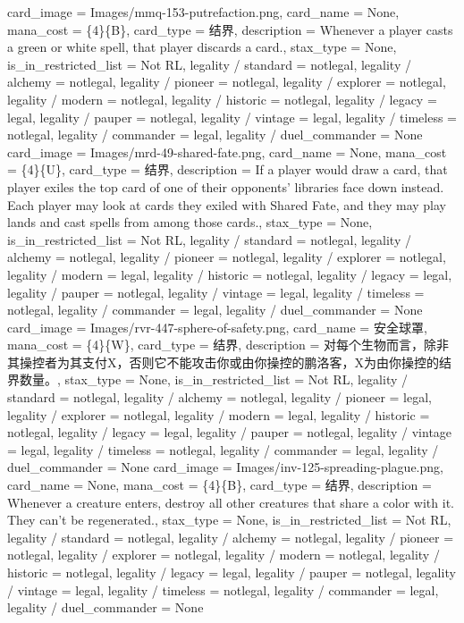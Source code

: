 \documentclass[lang = cn, color = black, 10pt]{AllThatStax}
\begin{document}
\card
{
	card_image = Images/mmq-153-putrefaction.png,
	card_name = None,
	mana_cost = \{4\}\{B\},
	card_type = 结界,
	description = Whenever a player casts a green or white spell, that player discards a card.,
	stax_type = None,
	is_in_restricted_list = Not RL,
	legality / standard = notlegal,
	legality / alchemy = notlegal,
	legality / pioneer = notlegal,
	legality / explorer = notlegal,
	legality / modern = notlegal,
	legality / historic = notlegal,
	legality / legacy = legal,
	legality / pauper = notlegal,
	legality / vintage = legal,
	legality / timeless = notlegal,
	legality / commander = legal,
	legality / duel_commander = None
}
\card
{
	card_image = Images/mrd-49-shared-fate.png,
	card_name = None,
	mana_cost = \{4\}\{U\},
	card_type = 结界,
	description = If a player would draw a card, that player exiles the top card of one of their opponents' libraries face down instead.
	Each player may look at cards they exiled with Shared Fate, and they may play lands and cast spells from among those cards.,
	stax_type = None,
	is_in_restricted_list = Not RL,
	legality / standard = notlegal,
	legality / alchemy = notlegal,
	legality / pioneer = notlegal,
	legality / explorer = notlegal,
	legality / modern = legal,
	legality / historic = notlegal,
	legality / legacy = legal,
	legality / pauper = notlegal,
	legality / vintage = legal,
	legality / timeless = notlegal,
	legality / commander = legal,
	legality / duel_commander = None
}
\card
{
	card_image = Images/rvr-447-sphere-of-safety.png,
	card_name = 安全球罩,
	mana_cost = \{4\}\{W\},
	card_type = 结界,
	description = 对每个生物而言，除非其操控者为其支付{X}，否则它不能攻击你或由你操控的鹏洛客，X为由你操控的结界数量。,
	stax_type = None,
	is_in_restricted_list = Not RL,
	legality / standard = notlegal,
	legality / alchemy = notlegal,
	legality / pioneer = legal,
	legality / explorer = notlegal,
	legality / modern = legal,
	legality / historic = notlegal,
	legality / legacy = legal,
	legality / pauper = notlegal,
	legality / vintage = legal,
	legality / timeless = notlegal,
	legality / commander = legal,
	legality / duel_commander = None
}
\card
{
	card_image = Images/inv-125-spreading-plague.png,
	card_name = None,
	mana_cost = \{4\}\{B\},
	card_type = 结界,
	description = Whenever a creature enters, destroy all other creatures that share a color with it. They can't be regenerated.,
	stax_type = None,
	is_in_restricted_list = Not RL,
	legality / standard = notlegal,
	legality / alchemy = notlegal,
	legality / pioneer = notlegal,
	legality / explorer = notlegal,
	legality / modern = notlegal,
	legality / historic = notlegal,
	legality / legacy = legal,
	legality / pauper = notlegal,
	legality / vintage = legal,
	legality / timeless = notlegal,
	legality / commander = legal,
	legality / duel_commander = None
}
\end{document}
